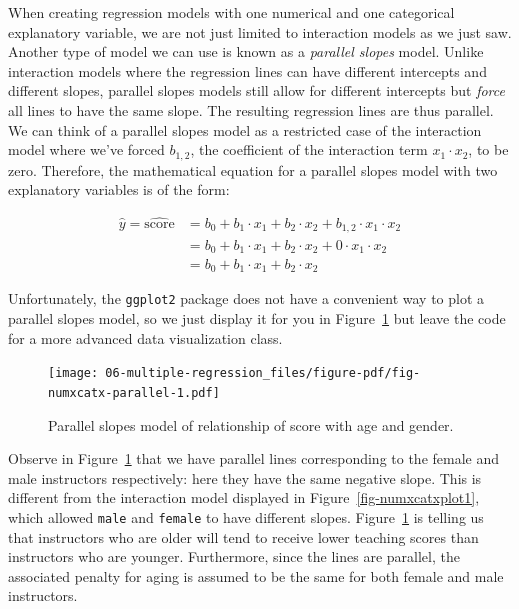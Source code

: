 \documentclass[
  letterpaper,
  DIV=11,
  numbers=noendperiod]{scrreprt}
\theoremstyle{definition}
\theoremstyle{remark}
\begin{document}
When creating regression models with one numerical and one categorical
explanatory variable, we are not just limited to interaction models as
we just saw. Another type of model we can use is known as a
\emph{parallel slopes} model. Unlike
interaction models where the regression lines can have different
intercepts and different slopes, parallel slopes models still allow for
different intercepts but \emph{force} all lines to have the same slope.
The resulting regression lines are thus parallel. We can think of a
parallel slopes model as a restricted case of the interaction model
where we've forced \(b_{1,2}\), the coefficient of the interaction term
\(x_{1} \cdot x_2\), to be zero. Therefore, the mathematical equation
for a parallel slopes model with two explanatory variables is of the
form:

\[
\begin{aligned}
\widehat{y} = \widehat{\text{score}} &= b_0 + b_{1} \cdot x_1 + b_{2} \cdot x_2 + b_{1,2} \cdot x_1 \cdot x_2\\
&= b_0 + b_{1} \cdot x_1 + b_{2} \cdot x_2 + 0 \cdot x_1 \cdot x_2\\
&= b_0 + b_{1} \cdot x_1 + b_{2} \cdot x_2
\end{aligned}
\]

Unfortunately, the \texttt{ggplot2} package does not have a convenient
way to plot a parallel slopes model, so we just display it for you in
Figure~\ref{fig-numxcatx-parallel} but leave the code for a more
advanced data visualization class.

\begin{figure}

{\centering \texttt{[image: 06-multiple-regression\_files/figure-pdf/fig-numxcatx-parallel-1.pdf]}

}

\caption{\label{fig-numxcatx-parallel}Parallel slopes model of
relationship of score with age and gender.}

\end{figure}

Observe in Figure~\ref{fig-numxcatx-parallel} that we have parallel
lines corresponding to the female and male instructors respectively:
here they have the same negative slope. This is different from the
interaction model displayed in Figure~\ref{fig-numxcatxplot1}, which
allowed \texttt{male} and \texttt{female} to have different slopes.
Figure~\ref{fig-numxcatx-parallel} is telling us that instructors who
are older will tend to receive lower teaching scores than instructors
who are younger. Furthermore, since the lines are parallel, the
associated penalty for aging is assumed to be the same for both female
and male instructors.
\end{document}
